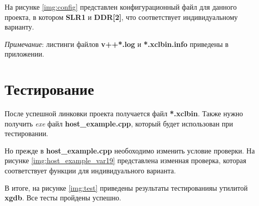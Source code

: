 На рисунке \ref{img:config} представлен конфигурационный файл для данного проекта, в котором \textbf{SLR1} и \textbf{DDR[2]}, что соответствует индивидуальному варианту.


\clearpage

\textit{Примечание}: листинги файлов \textbf{v++*.log} и \textbf{*.xclbin.info} приведены в приложении.


\section{Тестирование}

После успешной линковки проекта получается файл \textbf{*.xclbin}. Также нужно получить \textit{exe} файл \textbf{host\_example.cpp}, который будет использован при тестировании.

Но прежде в \textbf{host\_example.cpp} необоходимо изменить условие проверки. На рисунке \ref{img:host_example_var19} представлена изменная проверка, которая соответствует функции для индивидуального варианта.


В итоге, на рисунке \ref{img:test} приведены результаты тестированияы утилитой \textbf{xgdb}. Все тесты пройдены успешно.

